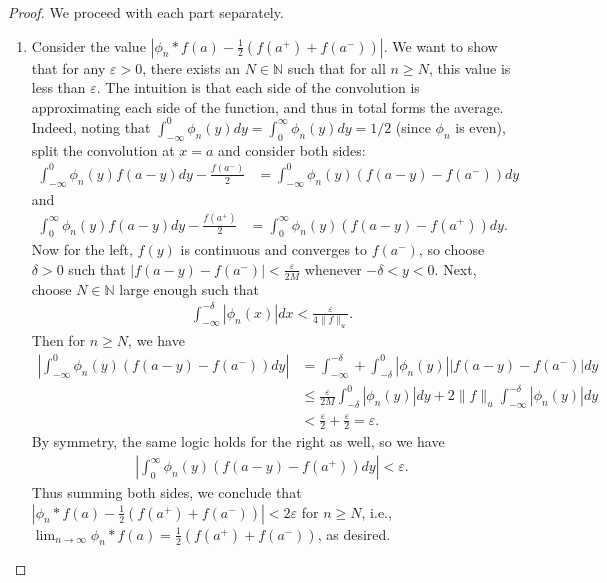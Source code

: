 \documentclass[12pt]{article}
\theoremstyle{remark}
\theoremstyle{named}
\renewcommand{\d}{\delta}
\newcommand{\e}{\varepsilon}
\newcommand{\N}{\mathbb N}
\newcommand{\abs}[1]{|#1|}
\newcommand{\bigabs}[1]{\left|#1\right|}
\begin{document}
\begin{proof}
    We proceed with each part separately.
    \begin{enumerate}
        \item Consider the value \(\abs{\phi_n * f(a) - \frac{1}{2}(f(a^+) + f(a^-))}\). We want to show that for any \(\e > 0\), there exists an \(N \in \N\) such that for all \(n \geq N\), this value is less than \(\e\). The intuition is that each side of the convolution is approximating each side of the function, and thus in total forms the average. Indeed, noting that \(\int_{-\infty}^{0}\phi_n(y) dy = \int_{0}^{\infty}\phi_n(y) dy = 1/2\) (since \(\phi_n\) is even), split the convolution at \(x = a\) and consider both sides:
        \begin{align*}
            \int_{-\infty}^{0} \phi_n(y) f(a - y) dy - \frac{f(a^-)}{2} &= \int_{-\infty}^{0} \phi_n(y) (f(a - y) - f(a^-)) dy
        \end{align*}
        and
        \begin{align*}
            \int_{0}^{\infty} \phi_n(y) f(a - y) dy - \frac{f(a^+)}{2} &= \int_{0}^{\infty} \phi_n(y) (f(a - y) - f(a^+)) dy.
        \end{align*}
        Now for the left, \(f(y)\) is continuous and converges to \(f(a^-)\), so choose \(\d > 0\) such that \(\abs{f(a - y) - f(a^-)} < \frac{\e}{2M}\) whenever \(-\d < y < 0\). Next, choose \(N \in \N\) large enough such that
        \begin{align*}
            \int_{-\infty}^{-\d} \abs{\phi_n(x)}dx < \frac{\e}{4 \|f\|_u}.
        \end{align*}
        Then for \(n \geq N\), we have
        \begin{align*}
            \bigabs{\int_{-\infty}^{0} \phi_n(y) (f(a - y) - f(a^-)) dy} &= \int_{-\infty}^{-\d} + \int_{-\d}^{0} \abs{\phi_n(y)} \abs{f(a - y) - f(a^-)} dy \\
            &\leq \frac{\e}{2M} \int_{- \d}^{0} \abs{\phi_n(y)} dy + 2\|f\|_u \int_{-\infty}^{-\d} \abs{\phi_n(y)} dy \\
            &< \frac{\e}{2} + \frac{\e}{2} = \e.
        \end{align*}
        By symmetry, the same logic holds for the right as well, so we have 
        \begin{align*}
            \bigabs{\int_{0}^{\infty} \phi_n(y) (f(a - y) - f(a^+)) dy} < \e.
        \end{align*}
        Thus summing both sides, we conclude that \(\abs{\phi_n * f(a) - \frac{1}{2}(f(a^+) + f(a^-))} < 2\e\) for \(n \geq N\), i.e., \(\lim_{n \to \infty}\phi_n * f(a) = \frac{1}{2}(f(a^+) + f(a^-))\), as desired.


\end{enumerate}
\end{proof}
\end{document}
